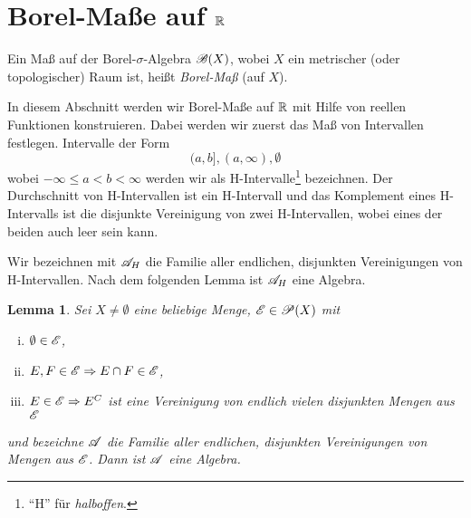 \documentclass[
 a4paper,
 12pt,
 parskip=half
 ]{scrreprt}
\theoremstyle{plain}
\newtheorem{lem}[thm]{Lemma}
\theoremstyle{definition}
\numberwithin{equation}{section}
\begin{document}
\section{Borel-Maße auf \texorpdfstring{$\mathbb{R}$}{IR}}
Ein Maß auf der Borel-$\sigma$-Algebra $\mathscr{B}(X)$, wobei $X$ ein metrischer (oder topologischer) Raum ist, heißt \emph{Borel-Maß} (auf $X$).

In diesem Abschnitt werden wir Borel-Maße auf $\mathbb{R}$ mit Hilfe von reellen Funktionen konstruieren. Dabei werden wir zuerst das Maß von Intervallen festlegen. Intervalle der Form 
\[ (a,b], (a, \infty), \emptyset \]
wobei $- \infty \le a < b < \infty$ werden wir als H-Intervalle\footnote{``H'' für \emph{halboffen}.} bezeichnen. Der Durchschnitt von H-Intervallen ist ein H-Intervall und das Komplement eines H-Intervalls ist die disjunkte Vereinigung von zwei H-Intervallen, wobei eines der beiden auch leer sein kann.

Wir bezeichnen mit $\mathscr{A}_H$ die Familie aller endlichen, disjunkten Vereinigungen von H-Intervallen. Nach dem folgenden Lemma ist $\mathscr{A}_H$ eine Algebra.

\begin{lem}
 Sei $X \ne \emptyset$ eine beliebige Menge, $\mathscr{E} \in \mathscr{P}(X)$ mit
 \begin{enumerate}[(i)]
  \item $\emptyset \in \mathscr{E}$,
  \item $E,F \in \mathscr{E} \Rightarrow E \cap F \in \mathscr{E}$,
  \item $E \in \mathscr{E} \Rightarrow E^C$ ist eine Vereinigung von endlich vielen disjunkten Mengen aus $\mathscr{E}$
 \end{enumerate}
und bezeichne $\mathscr{A}$ die Familie aller endlichen, disjunkten Vereinigungen von Mengen aus $\mathscr{E}$. Dann ist $\mathscr{A}$ eine Algebra.
\end{lem}
\end{document}
